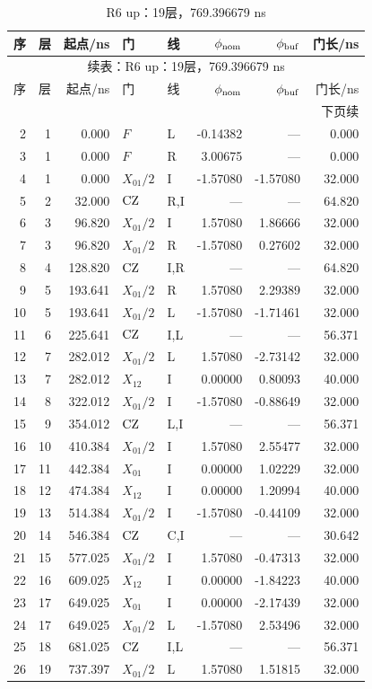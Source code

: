{\small\setlength{\tabcolsep}{4pt}\fontsize{9}{10.6}\selectfont\renewcommand{\arraystretch}{1.0}
\begin{longtable}{@{}rrrllrrr@{}}
\caption{R6 up：19层，769.396679 ns}\label{tab:r6up}\\\toprule
序 & 层 & 起点/ns & 门 & 线 & $\phi_{\rm nom}$ & $\phi_{\rm buf}$ & 门长/ns\\\midrule\endfirsthead
\multicolumn{8}{c}{续表：R6 up：19层，769.396679 ns}\\\toprule
序 & 层 & 起点/ns & 门 & 线 & $\phi_{\rm nom}$ & $\phi_{\rm buf}$ & 门长/ns\\\midrule\endhead
\midrule\multicolumn{8}{r}{下页续}\endfoot
\bottomrule\endlastfoot
1 & 1 & 0.000 & $F$ & C & 2.11427 & --- & 0.000\\
2 & 1 & 0.000 & $F$ & L & -0.14382 & --- & 0.000\\
3 & 1 & 0.000 & $F$ & R & 3.00675 & --- & 0.000\\
4 & 1 & 0.000 & $X_{01}/2$ & I & -1.57080 & -1.57080 & 32.000\\
5 & 2 & 32.000 & $\mathrm{CZ}$ & R,I & --- & --- & 64.820\\
6 & 3 & 96.820 & $X_{01}/2$ & I & 1.57080 & 1.86666 & 32.000\\
7 & 3 & 96.820 & $X_{01}/2$ & R & -1.57080 & 0.27602 & 32.000\\
8 & 4 & 128.820 & $\mathrm{CZ}$ & I,R & --- & --- & 64.820\\
9 & 5 & 193.641 & $X_{01}/2$ & R & 1.57080 & 2.29389 & 32.000\\
10 & 5 & 193.641 & $X_{01}/2$ & L & -1.57080 & -1.71461 & 32.000\\
11 & 6 & 225.641 & $\mathrm{CZ}$ & I,L & --- & --- & 56.371\\
12 & 7 & 282.012 & $X_{01}/2$ & L & 1.57080 & -2.73142 & 32.000\\
13 & 7 & 282.012 & $X_{12}$ & I & 0.00000 & 0.80093 & 40.000\\
14 & 8 & 322.012 & $X_{01}/2$ & I & -1.57080 & -0.88649 & 32.000\\
15 & 9 & 354.012 & $\mathrm{CZ}$ & L,I & --- & --- & 56.371\\
16 & 10 & 410.384 & $X_{01}/2$ & I & 1.57080 & 2.55477 & 32.000\\
17 & 11 & 442.384 & $X_{01}$ & I & 0.00000 & 1.02229 & 32.000\\
18 & 12 & 474.384 & $X_{12}$ & I & 0.00000 & 1.20994 & 40.000\\
19 & 13 & 514.384 & $X_{01}/2$ & I & -1.57080 & -0.44109 & 32.000\\
20 & 14 & 546.384 & $\mathrm{CZ}$ & C,I & --- & --- & 30.642\\
21 & 15 & 577.025 & $X_{01}/2$ & I & 1.57080 & -0.47313 & 32.000\\
22 & 16 & 609.025 & $X_{12}$ & I & 0.00000 & -1.84223 & 40.000\\
23 & 17 & 649.025 & $X_{01}$ & I & 0.00000 & -2.17439 & 32.000\\
24 & 17 & 649.025 & $X_{01}/2$ & L & -1.57080 & 2.53496 & 32.000\\
25 & 18 & 681.025 & $\mathrm{CZ}$ & I,L & --- & --- & 56.371\\
26 & 19 & 737.397 & $X_{01}/2$ & L & 1.57080 & 1.51815 & 32.000\\
\end{longtable}}
